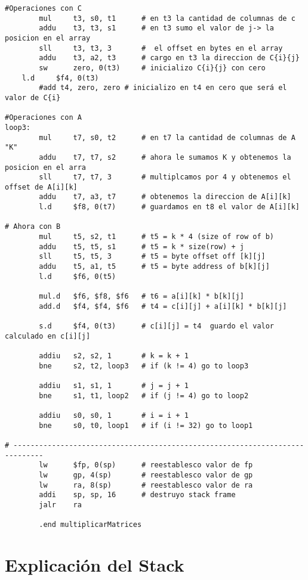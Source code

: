 \documentclass[a4paper,10pt]{article}
\begin{document}
\begin{lstlisting}
#Operaciones con C
        mul     t3, s0, t1      # en t3 la cantidad de columnas de c
        addu    t3, t3, s1      # en t3 sumo el valor de j-> la posicion en el array
        sll     t3, t3, 3       #  el offset en bytes en el array
        addu    t3, a2, t3      # cargo en t3 la direccion de C{i}{j}
        sw      zero, 0(t3)     # inicializo C{i}{j} con cero
	l.d     $f4, 0(t3)
        #add t4, zero, zero # inicializo en t4 en cero que será el valor de C{i}
		
#Operaciones con A
loop3:
        mul     t7, s0, t2      # en t7 la cantidad de columnas de A "K"
        addu    t7, t7, s2      # ahora le sumamos K y obtenemos la posicion en el arra
        sll     t7, t7, 3       # multiplcamos por 4 y obtenemos el offset de A[i][k]
        addu    t7, a3, t7      # obtenemos la direccion de A[i][k]
        l.d     $f8, 0(t7)      # guardamos en t8 el valor de A[i][k]
        
# Ahora con B
        mul     t5, s2, t1      # t5 = k * 4 (size of row of b)
        addu    t5, t5, s1      # t5 = k * size(row) + j
        sll     t5, t5, 3       # t5 = byte offset off [k][j]
        addu    t5, a1, t5      # t5 = byte address of b[k][j]
        l.d     $f6, 0(t5)

        mul.d   $f6, $f8, $f6   # t6 = a[i][k] * b[k][j]
        add.d   $f4, $f4, $f6   # t4 = c[i][j] + a[i][k] * b[k][j]

        s.d     $f4, 0(t3)      # c[i][j] = t4  guardo el valor calculado en c[i][j]

        addiu   s2, s2, 1       # k = k + 1
        bne     s2, t2, loop3   # if (k != 4) go to loop3

        addiu   s1, s1, 1       # j = j + 1
        bne     s1, t1, loop2   # if (j != 4) go to loop2

        addiu   s0, s0, 1       # i = i + 1
        bne     s0, t0, loop1   # if (i != 32) go to loop1

# -----------------------------------------------------------------------------
        lw      $fp, 0(sp)      # reestablesco valor de fp
        lw      gp, 4(sp)       # reestablesco valor de gp
        lw      ra, 8(sp)       # reestablesco valor de ra
        addi    sp, sp, 16      # destruyo stack frame
        jalr    ra

        .end multiplicarMatrices
\end{lstlisting}
\pagebreak
\section{Explicaci\'on del Stack}
\end{document}
